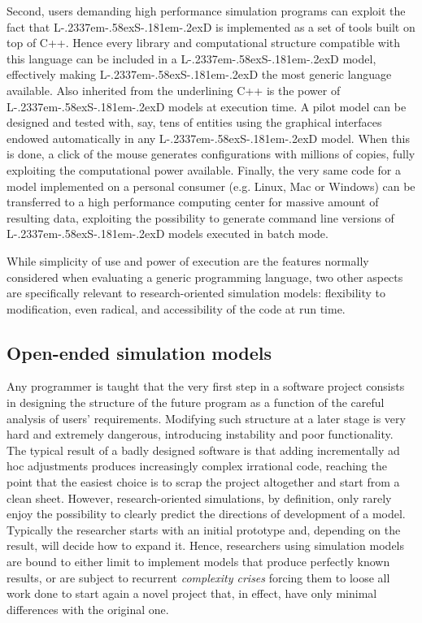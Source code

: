 \documentclass [11pt,a4paper] {book}
\def\LsD{{L\kern-.2337em\lower-.58ex\hbox{S}\kern-.181em\lower-.2ex\hbox{D}}\xspace}
\begin{document}
Second, users demanding high performance simulation programs can exploit the fact that \LsD is implemented as a set of tools built on top of C++. Hence every library and computational structure compatible with this language can be included in a \LsD model, effectively making \LsD the most generic language available. Also inherited from the underlining C++ is the power of \LsD models at execution time. A pilot model can be designed and tested with, say, tens of entities using the graphical interfaces endowed automatically in any \LsD model. When this is done, a click of the mouse generates configurations with millions of copies, fully exploiting the computational power available. Finally, the very same code for a model implemented on a personal consumer (e.g. Linux, Mac or Windows) can be transferred to a high performance computing center for massive amount of resulting data, exploiting the possibility to generate command line versions of \LsD models executed in batch mode.

While simplicity of use and power of execution are the features normally considered when evaluating a generic programming language, two other aspects are specifically relevant to research-oriented simulation models: flexibility to modification, even radical, and accessibility of the code at run time.

\subsection{Open-ended simulation models}

Any programmer is taught that the very first step in a software project consists in designing the structure of the future program as a function of the careful analysis of users' requirements. Modifying such structure at a later stage is very hard  and extremely dangerous, introducing instability and poor functionality. The typical result of a badly designed software is that adding incrementally ad hoc adjustments produces increasingly complex irrational code, reaching the point that the easiest choice is to scrap the project altogether and start from a clean sheet. However, research-oriented simulations, by definition, only rarely enjoy the possibility to clearly predict the directions of development of a model. Typically the researcher starts with an initial prototype and, depending on the result, will decide how to expand it. Hence, researchers using simulation models are bound to either limit to implement models that produce perfectly known results, or are subject to recurrent \textit{complexity crises} forcing them to loose all work done to start again a novel project that, in effect, have only minimal differences with the original one. 
\end{document}
